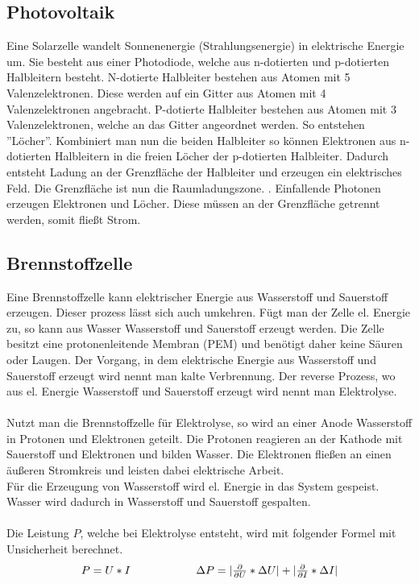 \documentclass[12pt,a4paper,twoside]{article}
\begin{document}
\subsection{Photovoltaik}
Eine Solarzelle wandelt Sonnenenergie (Strahlungsenergie) in elektrische Energie um. Sie besteht aus einer Photodiode, welche aus n-dotierten und p-dotierten Halbleitern besteht. 
N-dotierte Halbleiter bestehen aus Atomen mit 5 Valenzelektronen. Diese werden auf ein Gitter aus Atomen mit 4 Valenzelektronen angebracht. 
P-dotierte Halbleiter bestehen aus Atomen mit 3 Valenzelektronen, welche an das Gitter angeordnet werden. So entstehen ''Löcher''. Kombiniert man nun die beiden Halbleiter so können Elektronen aus n-dotierten Halbleitern in die freien Löcher der p-dotierten Halbleiter. 
Dadurch entsteht Ladung an der Grenzfläche der Halbleiter und erzeugen ein elektrisches Feld. Die Grenzfläche ist nun die Raumladungszone. . 
Einfallende Photonen erzeugen Elektronen und Löcher. Diese müssen an der Grenzfläche getrennt werden, somit fließt Strom. 

\subsection{Brennstoffzelle}
Eine Brennstoffzelle kann elektrischer Energie aus Wasserstoff und Sauerstoff erzeugen. 
Dieser prozess lässt sich auch umkehren. Fügt man der Zelle el. Energie zu, so kann aus Wasser Wasserstoff und Sauerstoff erzeugt werden. 
Die Zelle besitzt eine protonenleitende Membran (PEM) und benötigt daher keine Säuren oder Laugen. 
Der Vorgang, in dem elektrische Energie aus Wasserstoff und Sauerstoff erzeugt wird nennt man kalte Verbrennung. Der reverse Prozess, wo aus el. Energie Wasserstoff und Sauerstoff erzeugt wird nennt man Elektrolyse. 
\\
\\ 
Nutzt man die Brennstoffzelle für Elektrolyse, so wird an einer Anode Wasserstoff in Protonen und Elektronen geteilt. Die Protonen reagieren an der Kathode mit Sauerstoff und Elektronen und bilden Wasser. Die Elektronen fließen an einen äußeren Stromkreis und leisten dabei elektrische Arbeit. 
\\
Für die Erzeugung von Wasserstoff wird el. Energie in das System gespeist. Wasser wird dadurch in Wasserstoff und Sauerstoff gespalten. 
\\
\\
Die Leistung $P$, welche bei Elektrolyse entsteht, wird mit folgender Formel mit Unsicherheit berechnet. 
\begin{equation}
    \label{eq:leistung}
    \centerline{$P = U*I$  \\ $\Delta P = \vert \frac{\partial }{\partial U} * \Delta U \vert + \vert \frac{\partial }{\partial I} * \Delta I \vert$}
\end{equation}
\end{document}

